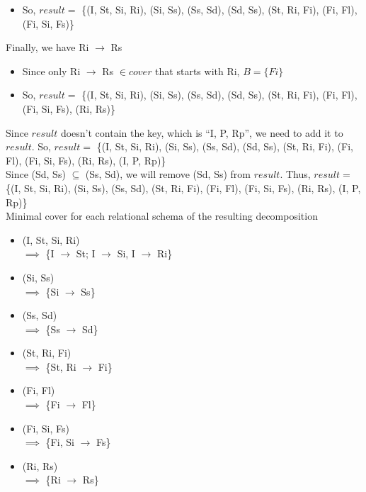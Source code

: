 \documentclass[12pt]{article}
\begin{document}
\begin{enumerate}
\begin{itemize}
          \item So, $result =$ \{(I, St, Si, Ri), (Si, Ss), (Ss, Sd), (Sd, Ss),
                (St, Ri, Fi), (Fi, Fl), (Fi, Si, Fs)\}
        \end{itemize}
        Finally, we have Ri $\longrightarrow$ Rs
        \begin{itemize}
          \item Since only Ri $\longrightarrow$ Rs $\in cover$ that starts
                with Ri, $B = \{Fi\}$
          \item So, $result =$ \{(I, St, Si, Ri), (Si, Ss), (Ss, Sd), (Sd, Ss),
                (St, Ri, Fi), (Fi, Fl), (Fi, Si, Fs), (Ri, Rs)\}
        \end{itemize}
        Since $result$ doesn't contain the key, which is ``I, P, Rp'', we need
        to add it to $result$. So, $result =$ \{(I, St, Si, Ri), (Si, Ss), (Ss,
        Sd), (Sd, Ss), (St, Ri, Fi), (Fi, Fl), (Fi, Si, Fs), (Ri, Rs), (I, P,
        Rp)\} \\
        Since (Sd, Ss) $\subseteq$ (Ss, Sd), we will remove (Sd, Ss) from
        $result$. Thus, $result =$ \{(I, St, Si, Ri), (Si, Ss), (Ss, Sd), (St,
        Ri, Fi), (Fi, Fl), (Fi, Si, Fs), (Ri, Rs), (I, P, Rp)\} \\

        Minimal cover for each relational schema of the resulting decomposition
        \begin{itemize}
          \item (I, St, Si, Ri) \\
                $\implies$ \{I $\longrightarrow$ St; I $\longrightarrow$ Si, I
                $\longrightarrow$ Ri\}
          \item (Si, Ss) \\
                $\implies$ \{Si $\longrightarrow$ Ss\}
          \item (Ss, Sd) \\
                $\implies$ \{Ss $\longrightarrow$ Sd\}
          \item (St, Ri, Fi) \\
                $\implies$ \{St, Ri $\longrightarrow$ Fi\}
          \item (Fi, Fl) \\
                $\implies$ \{Fi $\longrightarrow$ Fl\}
          \item (Fi, Si, Fs) \\
                $\implies$ \{Fi, Si $\longrightarrow$ Fs\}
          \item (Ri, Rs) \\
                $\implies$ \{Ri $\longrightarrow$ Rs\}
        \end{itemize}


\end{enumerate}
\end{document}
